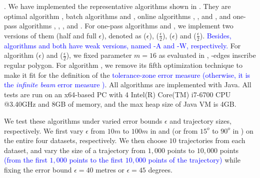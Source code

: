 

.
We have implemented the representative algorithms shown in .
 They are optimal algorithm \opt, batch algorithms \dpa and \tpa, online algorithms  \opwa, \bqsa, \squishe and \myblue{\dagots}, and one-pass algorithms  \operb, \siped, \cised, \intersec and \interval.
For one-pass algorithms \siped and \cised, we implement two versions of them (half and full $\epsilon$), denoted as \siped($\epsilon$), \siped($\frac{\epsilon}{2}$), \cised($\epsilon$) and \cised($\frac{\epsilon}{2}$).
\textcolor{blue}{Besides, algorithms \operb\cite{Lin:Operb} and \cised\cite{Lin:Cised} both have weak versions, named \operb-A and \cised-W, respectively.} %
For algorithm \cised($\epsilon$) and \cised($\frac{\epsilon}{2}$), we fixed parameter $m=16$ as evaluated in \cite{Lin:Cised}, -edges inscribe regular polygon.
For algorithm \operb, we remove its fifth optimization technique to make it fit for the definition of the \textcolor{blue}{tolerance-zone error measure \cite{Daescu:metric,Barequet:3D,Chen:Space,Imai:Optimal,Melkman:Optimal} (otherwise, it is the \emph{infinite beam} error measure \cite{Daescu:metric,Chen:Space})}.
All algorithms are implemented with Java.
{All tests are run on an x64-based  PC with 4 Intel(R) Core(TM) {i7-6700 CPU @3.40GHz} and 8GB of memory, and {the max heap size of Java VM is 4GB.}}


We test these algorithms under varied error bounds $\epsilon$ and trajectory sizes, respectively. We first vary $\epsilon$ from $10m$ to $100m$ in \ped and \sed (or from $15^o$ to $90^o$ in \dad) on the entire four datasets, respectively. We then choose $10$ trajectories from each dataset, and vary the size  of a trajectory from $1,000$ points to $10,000$ points \textcolor{blue}{(\ie from the first $1,000$ points to the first $10,000$ points of the trajectory)} while fixing the error bound $\epsilon=40$ metres or $\epsilon=45$ degrees.

